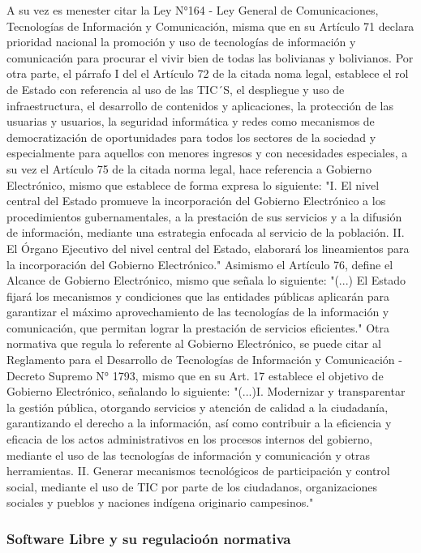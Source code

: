 A su vez es menester citar la Ley N°164 - Ley General de Comunicaciones, Tecnologías de Información y Comunicación, misma que en su Artículo 71 declara prioridad nacional la promoción y uso de tecnologías de información y comunicación para procurar el vivir bien de todas las bolivianas y bolivianos. Por otra parte, el párrafo I del el Artículo 72 de la citada noma legal, establece el rol de Estado con referencia al uso de las TIC´S, el despliegue y uso de infraestructura, el desarrollo de contenidos y aplicaciones, la protección de las usuarias y usuarios, la seguridad informática y redes como mecanismos de democratización de oportunidades para todos los sectores de la sociedad y especialmente para aquellos con menores ingresos y con necesidades especiales, a su vez el Artículo 75 de la citada norma legal, hace referencia a Gobierno Electrónico, mismo que establece de forma expresa lo siguiente: "I. El nivel central del Estado promueve la incorporación del Gobierno Electrónico a los procedimientos gubernamentales, a la prestación de sus servicios y a la difusión de información, mediante una estrategia enfocada al servicio de la población. II. El Órgano Ejecutivo del nivel central del Estado, elaborará los lineamientos para la incorporación del Gobierno Electrónico." Asimismo el Artículo 76, define el Alcance de Gobierno Electrónico, mismo que señala lo siguiente: "(...) El Estado fijará los mecanismos y condiciones que las entidades públicas aplicarán para garantizar el máximo aprovechamiento de las tecnologías de la información y comunicación, que permitan lograr la prestación de servicios eficientes."
Otra normativa que regula lo referente al Gobierno Electrónico, se puede citar al Reglamento para el Desarrollo de Tecnologías de Información y Comunicación - Decreto Supremo N° 1793, mismo que en su Art. 17 establece el objetivo de Gobierno Electrónico, señalando lo siguiente: "(...)I. Modernizar y transparentar la gestión pública, otorgando servicios y atención de calidad a la ciudadanía, garantizando el derecho a la información, así como contribuir a la eficiencia y eficacia de los actos administrativos en los procesos internos del gobierno, mediante el uso de las tecnologías de información y comunicación y otras herramientas. II. Generar mecanismos tecnológicos de participación y control social, mediante el uso de TIC por parte de los ciudadanos, organizaciones sociales y pueblos y naciones indígena originario campesinos."
\subsubsection{Software Libre y su regulacioón normativa}
